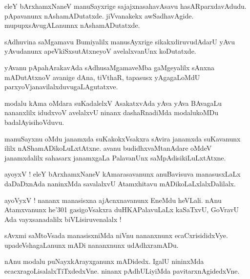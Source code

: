 \documentclass{article}
\begin{document}
\begin{mn}%
eleY bArxhamxNaneV manuSayxrige sajajxnasahavAsavu hasARparxdavAdudu. pApavanunx 
nAshamADutatxde. jiVvanakekx awSadhavAgide. mupupxsAvugALanunnx nAshamADutatxde.
\end{mn}

\begin{mn}%
sAdhuvina saMgamavu Bumiyalilx manusAyxrige sikakxdiruvudAdarU yAvu yAvudanunx 
apeVkiSxsutAtxneyoV avelalxvanUnx koDutatxde.
\end{mn}

\begin{mn}%
yAvanu pApahArakavAda sAdhusaMgamaveMba gaMgeyalilx sAnxna mADutAtxnoV avanige dAna, 
tiVthaR, tapasusx yAgagaLoMdU parxyoVjanavilalxduvugaLAgutatxve.
\end{mn}

\begin{mn}%
modalu kAma oMdara suKadalelxV AsakatxvAda yAva yAva BAvagaLu nananxlilx idudxvoV 
avelalxvU ninanx dashaRnadiMda modalukoMDu badalAyisihoVduvu.
\end{mn}

\begin{mn}%
manuSayxnu oMdu janamxda suKakokxVsakxra sAvira janamxda suKavanunx ililx 
nAShamADikoLuLxtAtxne. avanu budidhxvaMtanAdare oMdeV janamxdalilx sahasarx janamxgaLa 
PalavanUnx saMpAdisikiLuLxtAtxne.
\end{mn}

\begin{mn}%
ayoyxV ! eleY bArxhamxNaneV kAmarasavanunx anuBavisuva manasusxLaLx daDaDxnAda naninxMda 
savalalxvU Atamxhitavu mADikoLaLxlalxDalilalx.
\end{mn}

\begin{mn}%
ayoVyxV ! nananx manasisxna ajAcnxnavanunx EneMdu heVLali. nAnu Atamxvanunx he\char'301 
gasigoVsakxra duHKAPalavuLaLx kaSaTxvU, GoVravU Ada vayxsanadalilx biVLisiruvenalalx !
\end{mn}

\begin{mn}%
sAvxmi saMtoVsada manasisxniMda niVnu nananxnunx ecaCxrisididxVye. upadeVshagaLanunx mADi 
nananxnunx udAdhxramADu.
\end{mn}

\begin{mn}%
nAnu modalu puNayxkArayxganunx mADidedx. IgalU nininxMda ecacxragoLisalalxTiTxdedxVne. 
ninanx pAdhULiyiMda pavitarxnAgidedxVne.
\end{mn}
\end{document}
